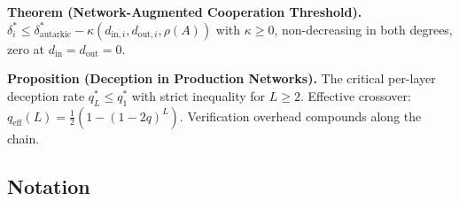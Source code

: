 \documentclass[11pt]{article}
\begin{document}
\textbf{Theorem (Network-Augmented Cooperation Threshold).}
\(\delta_i^* \leq \delta^*_{\mathrm{autarkic}} - \kappa(d_{\mathrm{in},i}, d_{\mathrm{out},i}, \rho(A))\)
with \(\kappa \geq 0\), non-decreasing in both degrees, zero at
\(d_{\mathrm{in}} = d_{\mathrm{out}} = 0\).

\textbf{Proposition (Deception in Production Networks).} The critical
per-layer deception rate \(q_L^* \leq q_1^*\) with strict inequality for
\(L \geq 2\). Effective crossover:
\(q_{\mathrm{eff}}(L) = \frac{1}{2}(1 - (1-2q)^L)\). Verification
overhead compounds along the chain.

\subsection{Notation}\label{notation}
\end{document}
